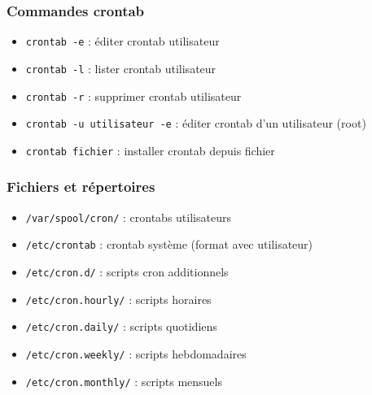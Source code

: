 \documentclass[12pt,a4paper]{article}
\begin{document}
\subsubsection{Commandes crontab}
\begin{itemize}
    \item \texttt{crontab -e} : \'editer crontab utilisateur %
    \item \texttt{crontab -l} : lister crontab utilisateur %
    \item \texttt{crontab -r} : supprimer crontab utilisateur %
    \item \texttt{crontab -u utilisateur -e} : \'editer crontab d'un utilisateur (root) %
    \item \texttt{crontab fichier} : installer crontab depuis fichier %
\end{itemize}

\subsubsection{Fichiers et r\'epertoires}
\begin{itemize}
    \item \texttt{/var/spool/cron/} : crontabs utilisateurs %
    \item \texttt{/etc/crontab} : crontab syst\`eme (format avec utilisateur) %
    \item \texttt{/etc/cron.d/} : scripts cron additionnels %
    \item \texttt{/etc/cron.hourly/} : scripts horaires %
    \item \texttt{/etc/cron.daily/} : scripts quotidiens %
    \item \texttt{/etc/cron.weekly/} : scripts hebdomadaires %
    \item \texttt{/etc/cron.monthly/} : scripts mensuels %
\end{itemize}

\end{document}
